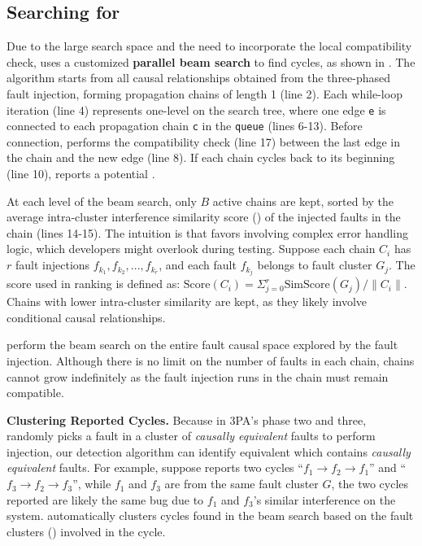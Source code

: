 \subsection{Searching for \VCs}
\label{sec:guided-search}



Due to the large search space 
and the need to 
incorporate the local compatibility check, 
\tool uses a customized \textbf{parallel beam search} 
to find cycles, 
as shown in . 
The algorithm starts from all causal relationships obtained from the three-phased fault injection, forming propagation chains of length 1 (line 2).
Each while-loop iteration (line 4) represents one-level on the search tree, where one edge \texttt{e} is connected to each propagation chain \texttt{c} in the \texttt{queue} (lines 6-13). Before connection, \tool performs the compatibility check (line 17) between the last edge in the chain and the new edge (line 8). If each chain cycles back to its beginning (line 10), \tool reports a potential \vc.




At each level of the beam search, only $B$ active chains are kept, sorted by the average intra-cluster interference similarity score () of the injected faults in the chain (lines 14-15). The intuition is that \tool favors \vcs involving complex error handling logic, which developers might overlook during testing. Suppose each chain $C_i$ has $r$ fault injections $f_{k_1}, f_{k_2}, ..., f_{k_r}$, and each fault $f_{k_j}$ belongs to fault cluster $G_j$. The score used in ranking is defined as: 
$ \mathrm{Score}(C_i) = \Sigma_{j=0}^r \mathrm{SimScore}(G_j) / \lVert C_i \rVert$. 
Chains with lower intra-cluster similarity are kept, as they likely involve conditional causal relationships.

\tool perform the beam search on the entire fault causal space explored by the fault injection. 
Although there is no limit on the number of faults in each chain, chains cannot grow indefinitely as the fault injection runs in the chain must remain compatible.


\textbf{Clustering Reported Cycles.} 
Because in 3PA's phase two and three, 
\tool randomly picks a fault in a cluster of \textit{causally equivalent} faults 
to perform injection, 
our detection algorithm can identify 
equivalent \vcs 
which contains \textit{causally equivalent} faults. 
For example, suppose \tool reports two cycles ``$f_1 \rightarrow f_2 \rightarrow f_1$'' and ``$f_3 \rightarrow f_2 \rightarrow f_3$'', while $f_1$ and $f_3$ are from the same fault cluster $G$, the two cycles reported are likely the same bug due to $f_1$ and $f_3$'s similar interference on the system.
\tool automatically clusters cycles found in the beam search based on the fault clusters () involved in the cycle. 
